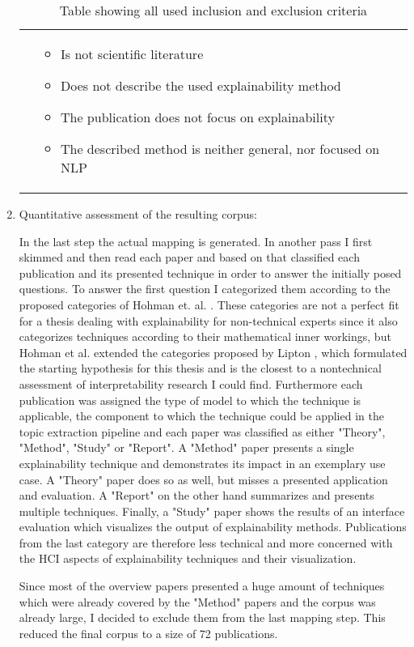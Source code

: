 \begin{enumerate}
\begin{table}
\begin{tabular}{  p{5cm} | p{5cm} }
			&
			
			\begin{itemize}
				\item Is not scientific literature
				\item Does not describe the used explainability method
				\item The publication does not focus on explainability
				\item The described method is neither general, nor focused on NLP
			\end{itemize}
		\end{tabular}
		\caption{\label{tbl:incl_excl} Table showing all used inclusion and exclusion criteria}
	\end{table}
	
	\item Quantitative assessment of the resulting corpus:
	
	In the last step the actual mapping is generated. In another pass I first skimmed and then read each paper and based on that classified each publication and its presented technique in order to answer the initially posed questions. To answer the first question I categorized them according to the proposed categories of Hohman et. al. \cite{hohmanGamutDesignProbe2019}. These categories are not a perfect fit for a thesis dealing with explainability for non-technical experts since it also categorizes techniques according to their mathematical inner workings, but Hohman et al. extended the categories proposed by Lipton \cite{liptonMythosModelInterpretability2016a}, which formulated the starting hypothesis for this thesis and is the closest to a nontechnical assessment of interpretability research I could find. Furthermore each publication was assigned the type of model to which the technique is applicable, the component to which the technique could be applied in the topic extraction pipeline and each paper was classified as either "Theory", "Method", "Study" or "Report". 
	A "Method" paper presents a single explainability technique and demonstrates its impact in an exemplary use case. A "Theory" paper does so as well, but misses a presented application and evaluation. A "Report" on the other hand summarizes and presents multiple techniques. Finally, a "Study" paper shows the results of an interface evaluation which visualizes the output of explainability methods. Publications from the last category are therefore less technical and more concerned with the HCI aspects of explainability techniques and their visualization.
	
	Since most of the overview papers presented a huge amount of techniques which were already covered by the "Method" papers and the corpus was already large, I decided to exclude them from the last mapping step. This reduced the final corpus to a size of 72 publications.

\end{enumerate}

